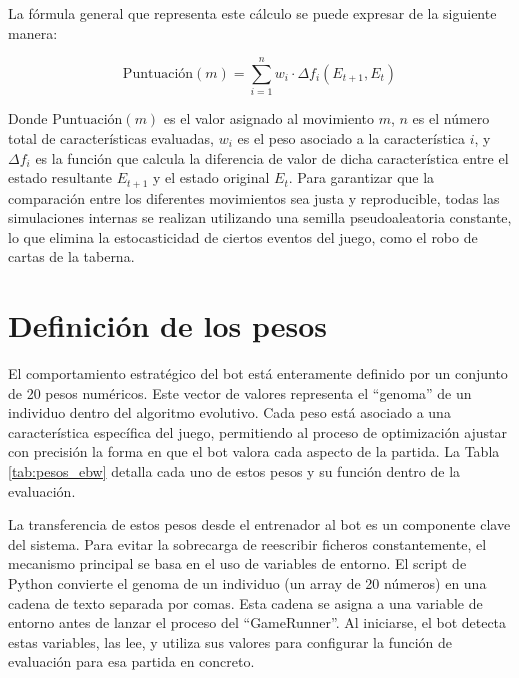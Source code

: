 La fórmula general que representa este cálculo se puede expresar de la siguiente manera:

$$ \text{Puntuación}(m) = \sum_{i=1}^{n} w_i \cdot \Delta f_i(E_{t+1}, E_t) $$

Donde $\text{Puntuación}(m)$ es el valor asignado al movimiento $m$, $n$ es el número total de características evaluadas, $w_i$ es el peso asociado a la característica $i$, y $\Delta f_i$ es la función que calcula la diferencia de valor de dicha característica entre el estado resultante $E_{t+1}$ y el estado original $E_t$. Para garantizar que la comparación entre los diferentes movimientos sea justa y reproducible, todas las simulaciones internas se realizan utilizando una semilla pseudoaleatoria constante, lo que elimina la estocasticidad de ciertos eventos del juego, como el robo de cartas de la taberna.

\section{Definición de los pesos} \label{sec:definicion_pesos}

El comportamiento estratégico del bot está enteramente definido por un conjunto de 20 pesos numéricos. Este vector de valores representa el ``genoma'' de un individuo dentro del algoritmo evolutivo. Cada peso está asociado a una característica específica del juego, permitiendo al proceso de optimización ajustar con precisión la forma en que el bot valora cada aspecto de la partida. La Tabla \ref{tab:pesos_ebw} detalla cada uno de estos pesos y su función dentro de la evaluación.

La transferencia de estos pesos desde el entrenador al bot es un componente clave del sistema. Para evitar la sobrecarga de reescribir ficheros constantemente, el mecanismo principal se basa en el uso de variables de entorno. El script de Python convierte el genoma de un individuo (un array de 20 números) en una cadena de texto separada por comas. Esta cadena se asigna a una variable de entorno antes de lanzar el proceso del ``GameRunner''. Al iniciarse, el bot detecta estas variables, las lee, y utiliza sus valores para configurar la función de evaluación para esa partida en concreto.

